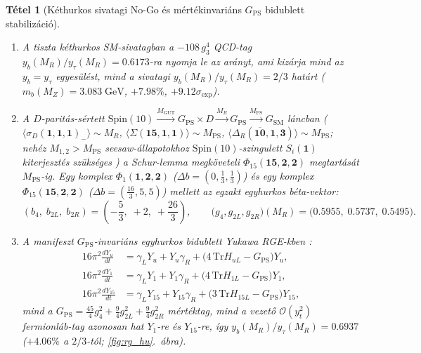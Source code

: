 \documentclass[11pt,a4paper]{article}
\newtheorem{theorem}{Tétel}[section]
\begin{document}
\begin{theorem}[Kéthurkos sivatagi No-Go és mértékinvariáns $G_{\mathrm{PS}}$ bidublett stabilizáció]
\begin{enumerate}[label=(\roman*),leftmargin=1.8em,itemsep=2pt]
\item A tiszta kéthurkos SM-sivatagban a $-108\,g_3^4$ QCD-tag $y_b(M_R)/y_\tau(M_R) = 0.6173$-ra nyomja le az arányt, ami kizárja mind az $y_b = y_\tau$ egyesülést, mind a sivatagi $y_b(M_R)/y_\tau(M_R) = 2/3$ határt ($m_b(M_Z) = 3.083\;\mathrm{GeV}$, $+7.98\%$, $+9.12\sigma_{\mathrm{exp}}$).
\item A $D$-paritás-sértett $\mathrm{Spin}(10) \xrightarrow{M_{\mathrm{GUT}}} G_{\mathrm{PS}}\times D \xrightarrow{M_R} G_{\mathrm{PS}} \xrightarrow{M_{\mathrm{PS}}} G_{\mathrm{SM}}$ láncban \cite{Slansky1981,ChangMohapatraParida1984} ($\langle\sigma_D(\mathbf{1},\mathbf{1},\mathbf{1})_-\rangle \sim M_R$, $\langle\Sigma(\mathbf{15},\mathbf{1},\mathbf{1})\rangle \sim M_{\mathrm{PS}}$, $\langle\Delta_R(\overline{\mathbf{10}},\mathbf{1},\mathbf{3})\rangle \sim M_{\mathrm{PS}}$; nehéz $M_{1,2} > M_{\mathrm{PS}}$ seesaw-állapotokhoz $\mathrm{Spin}(10)$-szingulett $S_i(\mathbf{1})$ kiterjesztés szükséges \cite{MalinskyRomaoValle2005}) a Schur-lemma megköveteli $\Phi_{15}(\mathbf{15},\mathbf{2},\mathbf{2})$ megtartását $M_{\mathrm{PS}}$-ig. Egy komplex $\Phi_1(\mathbf{1},\mathbf{2},\mathbf{2})$ ($\Delta b = (0,\frac{1}{3},\frac{1}{3})$) és egy komplex $\Phi_{15}(\mathbf{15},\mathbf{2},\mathbf{2})$ ($\Delta b = (\frac{16}{3},5,5)$) mellett az egzakt egyhurkos béta-vektor:
\begin{equation}
(b_4,\; b_{2L},\; b_{2R}) = \left(-\frac{5}{3},\; +2,\; +\frac{26}{3}\right), \qquad
\big(g_4, g_{2L}, g_{2R}\big)(M_R) = \big(0.5955,\; 0.5737,\; 0.5495\big).
\end{equation}
\item A manifeszt $G_{\mathrm{PS}}$-invariáns egyhurkos bidublett Yukawa RGE-kben \cite{MeloniOhlssonRiad2014}:
\begin{align}
16\pi^2 \frac{dY_u}{dt} &= \gamma_L Y_u + Y_u \gamma_R + \big(4\,\mathrm{Tr}H_{uL} - G_{\mathrm{PS}}\big)Y_u, \nonumber\\
16\pi^2 \frac{dY_1}{dt} &= \gamma_L Y_1 + Y_1 \gamma_R + \big(4\,\mathrm{Tr}H_{1L} - G_{\mathrm{PS}}\big)Y_1, \\
16\pi^2 \frac{dY_{15}}{dt} &= \gamma_L Y_{15} + Y_{15} \gamma_R + \big(3\,\mathrm{Tr}H_{15L} - G_{\mathrm{PS}}\big)Y_{15}, \nonumber
\end{align}
mind a $G_{\mathrm{PS}} = \frac{45}{4}g_4^2 + \frac{9}{4}g_{2L}^2 + \frac{9}{4}g_{2R}^2$ mértéktag, mind a vezető $\mathcal{O}(y_t^2)$ fermionláb-tag azonosan hat $Y_1$-re és $Y_{15}$-re, így $y_b(M_R)/y_\tau(M_R) = \mathbf{0.6937}$ ($+4.06\%$ a $2/3$-tól; \ref{fig:rg_hu}.~ábra).
\end{enumerate}
\end{theorem}
\end{document}
